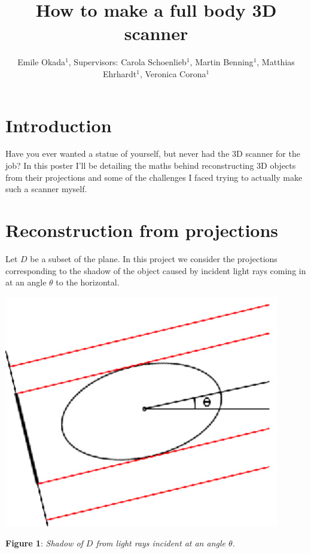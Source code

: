 \documentclass[noback]{cuposter}
\begin{document}
\newcommand{\don}{\ensuremath{d_{\textsc{ON}}}}
\newcommand{\doff}{\ensuremath{d_{\textsc{OFF}}}}
\newcommand{\dsoma}{\ensuremath{d_{\textsc{SOMA}}} \xspace}
\newcommand{\um}{\ensuremath{\mu \text{m}}\xspace}
\newcommand{\dmin}{d$_{\textup{min}}$\xspace}

\title{How to make a full body 3D scanner}
\author{Emile Okada$^1$, Supervisors: Carola Schoenlieb$^1$, Martin Benning$^1$, Matthias Ehrhardt$^1$, Veronica Corona$^1$}
\address{$^1$University of Cambridge}

\makeposter

\section{Introduction}
Have you ever wanted a statue of yourself, but never had the 3D scanner for the job? 
In this poster I'll be detailing the maths behind reconstructing 3D objects from their projections and some of the challenges I faced trying to actually make such a scanner myself.

\section{Reconstruction from projections}
Let $D$ be a subset of the plane.
In this project we consider the projections corresponding to the shadow of the object caused by incident light rays coming in at an angle $\theta$ to the horizontal.

\vspace*{2cm}
{
\centerline{\includegraphics[width=12cm]
  {figs/shadow_1.ps}}
}
\vspace*{5mm} \textbf{Figure 1}: \textit{Shadow of $D$ from light rays incident at an angle $\theta$.}
\end{document}
